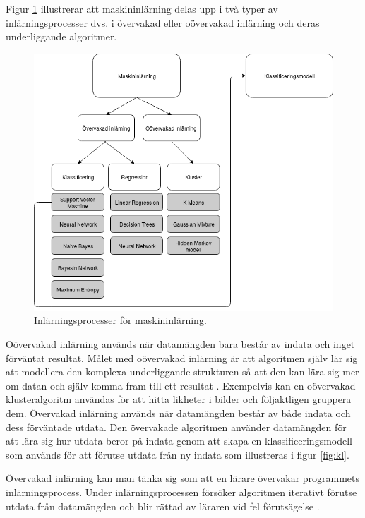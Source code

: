 \documentclass{kaumasters} %
\begin{document}
Figur \ref{fig:ml} illustrerar att maskininlärning delas upp i två typer av inlärningsprocesser dvs. i övervakad eller oövervakad inlärning och deras underliggande algoritmer.
\begin{figure}[h]
\includegraphics[width=12cm]{ml}
\centering
\caption{Inlärningsprocesser för maskininlärning.}
\label{fig:ml}
\end{figure}

Oövervakad inlärning används när datamängden bara består av indata och inget förväntat resultat. Målet med oövervakad inlärning är att algoritmen själv lär sig att modellera den komplexa underliggande strukturen så att den kan lära sig mer om datan och själv komma fram till ett resultat \cite{wiki:007}. Exempelvis kan en oövervakad klusteralgoritm användas för att hitta likheter i bilder och följaktligen gruppera dem.
Övervakad inlärning används när datamängden består av både indata och dess förväntade utdata. Den övervakade algoritmen använder datamängden för att lära sig hur utdata beror på indata genom att skapa en klassificeringsmodell som används för att förutse utdata från ny indata som illustreras i figur \ref{fig:kl}. 

Övervakad inlärning kan man tänka sig som att en lärare övervakar programmets inlärningsprocess. Under inlärningsprocessen försöker algoritmen iterativt förutse utdata från datamängden och blir rättad av läraren vid fel förutsägelse \cite{learning:001}.
\end{document}
